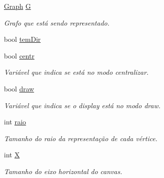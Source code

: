\begin{DoxyCompactItemize}
\item 
\mbox{\label{classGraphDisplay_acfb839eaef7974c684794a3d5d69c79a}} 
\mbox{\hyperlink{classGraph}{Graph}} \mbox{\hyperlink{classGraphDisplay_acfb839eaef7974c684794a3d5d69c79a}{G}}
\begin{DoxyCompactList}\small\item\em Grafo que está sendo representado. \end{DoxyCompactList}\item 
bool \mbox{\hyperlink{classGraphDisplay_a9d9f390d193fda9a5503b7629fd50bf3}{tem\+Dir}}
\item 
\mbox{\label{classGraphDisplay_a15611d65df010f7ec38c07d1a7db525e}} 
bool \mbox{\hyperlink{classGraphDisplay_a15611d65df010f7ec38c07d1a7db525e}{centr}}
\begin{DoxyCompactList}\small\item\em Variável que indica se está no modo \textquotesingle{}centralizar\textquotesingle{}. \end{DoxyCompactList}\item 
\mbox{\label{classGraphDisplay_ae3f92d7ff79660d81ac0edf3c04365b1}} 
bool \mbox{\hyperlink{classGraphDisplay_ae3f92d7ff79660d81ac0edf3c04365b1}{draw}}
\begin{DoxyCompactList}\small\item\em Variável que indica se o display está no modo \textquotesingle{}draw\textquotesingle{}. \end{DoxyCompactList}\item 
\mbox{\label{classGraphDisplay_acb515993d45bb40131c1057a21151310}} 
int \mbox{\hyperlink{classGraphDisplay_acb515993d45bb40131c1057a21151310}{raio}}
\begin{DoxyCompactList}\small\item\em Tamanho do raio da representação de cada vértice. \end{DoxyCompactList}\item 
\mbox{\label{classGraphDisplay_abcaa65d083c953adc21017aa1df335ce}} 
int \mbox{\hyperlink{classGraphDisplay_abcaa65d083c953adc21017aa1df335ce}{X}}
\begin{DoxyCompactList}\small\item\em Tamanho do eixo horizontal do canvas. \end{DoxyCompactList}\item 

\end{DoxyCompactItemize}
